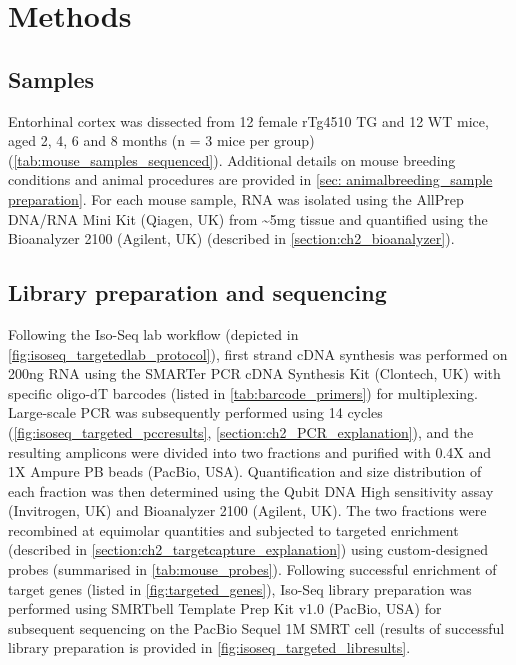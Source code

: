 \restoregeometry

 

\section{Methods}

\subsection{Samples}
Entorhinal cortex was dissected from 12 female rTg4510 TG and 12 WT mice, aged 2, 4, 6 and 8 months (n = 3 mice per group) (\cref{tab:mouse_samples_sequenced}). Additional details on mouse breeding conditions and animal procedures are provided in \cref{sec: animalbreeding_sample preparation}. For each mouse sample, RNA was isolated using the AllPrep DNA/RNA Mini Kit (Qiagen, UK) from \textasciitilde5mg tissue and quantified using the Bioanalyzer 2100 (Agilent, UK) (described in \cref{section:ch2_bioanalyzer}). 

\subsection{Library preparation and sequencing}
Following the Iso-Seq lab workflow (depicted in \cref{fig:isoseq_targetedlab_protocol}), first strand cDNA synthesis was performed on 200ng RNA using the SMARTer PCR cDNA Synthesis Kit (Clontech, UK) with specific oligo-dT barcodes (listed in \cref{tab:barcode_primers}) for multiplexing. Large-scale PCR was subsequently performed using 14 cycles (\cref{fig:isoseq_targeted_pccresults}, \cref{section:ch2_PCR_explanation}), and the resulting amplicons were divided into two fractions and purified with 0.4X and 1X Ampure PB beads (PacBio, USA). Quantification and size distribution of each fraction was then determined using the Qubit DNA High sensitivity assay (Invitrogen, UK) and Bioanalyzer 2100 (Agilent, UK). The two fractions were recombined at equimolar quantities and subjected to targeted enrichment (described in \cref{section:ch2_targetcapture_explanation}) using custom-designed probes (summarised in \cref{tab:mouse_probes}). Following successful enrichment of target genes (listed in \cref{fig:targeted_genes}), Iso-Seq library preparation was performed using SMRTbell Template Prep Kit v1.0 (PacBio, USA) for subsequent sequencing on the PacBio Sequel 1M SMRT cell (results of successful library preparation is provided in \cref{fig:isoseq_targeted_libresults}. 

